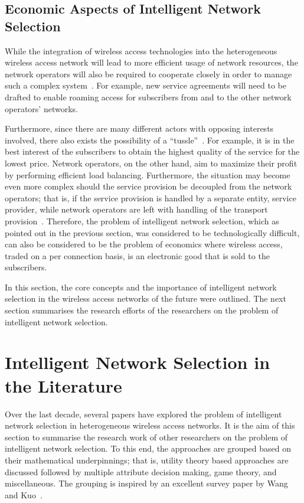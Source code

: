 \subsection{Economic Aspects of Intelligent Network Selection} %
\label{sub:economic_aspects_of_intelligent_network_selection_intelligent}
While the integration of wireless access technologies into the heterogeneous wireless access network will lead to more efficient usage of network resources, the network operators will also be required to cooperate closely in order to manage such a complex system~\cite{HossainBeaubrun09,HossainTalebiFard09}. For example, new service agreements will need to be drafted to enable roaming access for subscribers from and to the other network operators' networks.

Furthermore, since there are many different actors with opposing interests involved, there also exists the possibility of a ``tussle''~\cite{Clark02}. For example, it is in the best interest of the subscribers to obtain the highest quality of the service for the lowest price. Network operators, on the other hand, aim to maximize their profit by performing efficient load balancing. Furthermore, the situation may become even more complex should the service provision be decoupled from the network operators; that is, if the service provision is handled by a separate entity, service provider, while network operators are left with handling of the transport provision~\cite{DMBushTussle09}. Therefore, the problem of intelligent network selection, which as pointed out in the previous section, was considered to be technologically difficult, can also be considered to be the problem of economics where wireless access, traded on a per connection basis, is an electronic good that is sold to the subscribers.

In this section, the core concepts and the importance of intelligent network selection in the wireless access networks of the future were outlined. The next section summarises the research efforts of the researchers on the problem of intelligent network selection.

\section{Intelligent Network Selection in the Literature} %
\label{sec:intelligent_network_selection_in_the_literature_intelligent}
Over the last decade, several papers have explored the problem of intelligent network selection in heterogeneous wireless access networks. It is the aim of this section to summarise the research work of other researchers on the problem of intelligent network selection. To this end, the approaches are grouped based on their mathematical underpinnings; that is, utility theory based approaches are discussed followed by multiple attribute decision making, game theory, and miscellaneous. The grouping is inspired by an excellent survey paper by Wang and Kuo~\cite{LushengKuo2013}.

